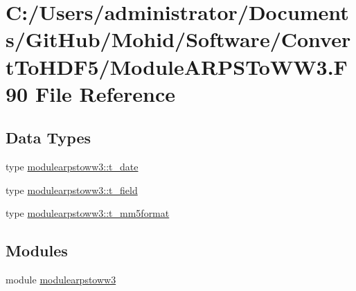 \hypertarget{_module_a_r_p_s_to_w_w3_8_f90}{}\section{C\+:/\+Users/administrator/\+Documents/\+Git\+Hub/\+Mohid/\+Software/\+Convert\+To\+H\+D\+F5/\+Module\+A\+R\+P\+S\+To\+W\+W3.F90 File Reference}
\label{_module_a_r_p_s_to_w_w3_8_f90}
\subsection*{Data Types}
\begin{DoxyCompactItemize}
\item 
type \mbox{\hyperlink{structmodulearpstoww3_1_1t__date}{modulearpstoww3\+::t\+\_\+date}}
\item 
type \mbox{\hyperlink{structmodulearpstoww3_1_1t__field}{modulearpstoww3\+::t\+\_\+field}}
\item 
type \mbox{\hyperlink{structmodulearpstoww3_1_1t__mm5format}{modulearpstoww3\+::t\+\_\+mm5format}}
\end{DoxyCompactItemize}
\subsection*{Modules}
\begin{DoxyCompactItemize}
\item 
module \mbox{\hyperlink{namespacemodulearpstoww3}{modulearpstoww3}}
\end{DoxyCompactItemize}

